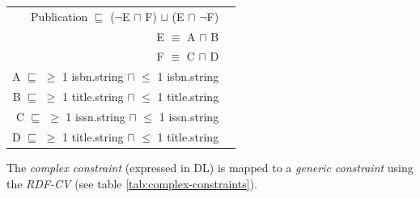 \documentclass{llncs}
\newenvironment{gcotable}{
  \scriptsize
  \sffamily
  \vspace{0cm}
	\begin{center}
  \begin{tabular}{l|l|l|l|l|l|l}
  \hline
  \textbf{c. type} & \textbf{context class} & \textbf{left p. list} & \textbf{right p. list} & \textbf{classes} & \textbf{c. element} & \textbf{c. value} \\
  \hline

}{
  \hline
  \end{tabular}
	\end{center}
}
\newenvironment{DL}{
  \vspace{0cm}
	\begin{center}
  \begin{tabular}{r l}

}{
  \end{tabular}
	\end{center}
}
\begin{document}
\begin{DL}
Publication $\sqsubseteq$ ($\neg$E $\sqcap$ F) $\sqcup$ (E $\sqcap$ $\neg$F) \\ 
E $\equiv$ A $\sqcap$ B \\
F $\equiv$ C $\sqcap$ D \\
A $\sqsubseteq$ $\geq$ 1 isbn.string $\sqcap$ $\leq$ 1 isbn.string \\
B $\sqsubseteq$ $\geq$ 1 title.string $\sqcap$ $\leq$ 1 title.string \\
C $\sqsubseteq$ $\geq$ 1 issn.string $\sqcap$ $\leq$ 1 issn.string \\
D $\sqsubseteq$ $\geq$ 1 title.string $\sqcap$ $\leq$ 1 title.string \\
\end{DL}

The \emph{complex constraint} (expressed in DL) is mapped to a \emph{generic constraint} using the \emph{RDF-CV} (see table \ref{tab:complex-constraints}).

\end{document}
